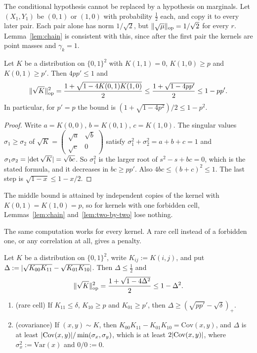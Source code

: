 The conditional hypothesis cannot be replaced by a hypothesis on marginals. Let $(X_1,Y_1)$ be $(0,1)$ or $(1,0)$ with probability $\frac12$ each, and copy it to every later pair. Each pair alone has norm $1/\sqrt2$, but $\lVert \sqrt\mu\rVert_{\mathrm{op}}=1/\sqrt2$ for every $r$. Lemma~\ref{lem:chain} is consistent with this, since after the first pair the kernels are point masses and $\gamma_k=1$.

\begin{lemma}\label{lem:two-by-two}
Let $K$ be a distribution on $\{0,1\}^2$ with $K(1,1)=0$, $K(1,0)\ge p$ and $K(0,1)\ge p'$. Then $4pp'\le1$ and
\[
  \lVert \sqrt K\rVert_{\mathrm{op}}^2=\frac{1+\sqrt{1-4K(0,1)K(1,0)}}2\le\frac{1+\sqrt{1-4pp'}}2\le1-pp' .
\]
In particular, for $p'=p$ the bound is $(1+\sqrt{1-4p^2})/2\le1-p^2$.
\end{lemma}

\begin{proof}
Write $a=K(0,0)$, $b=K(0,1)$, $c=K(1,0)$. The singular values $\sigma_1\ge\sigma_2$ of $\sqrt K=\left(\begin{smallmatrix}\sqrt a&\sqrt b\\ \sqrt c&0\end{smallmatrix}\right)$ satisfy $\sigma_1^2+\sigma_2^2=a+b+c=1$ and $\sigma_1\sigma_2=\lvert \det\sqrt K\rvert=\sqrt{bc}$. So $\sigma_1^2$ is the larger root of $s^2-s+bc=0$, which is the stated formula, and it decreases in $bc\ge pp'$. Also $4bc\le(b+c)^2\le1$. The last step is $\sqrt{1-x}\le1-x/2$.
\end{proof}

The middle bound is attained by independent copies of the kernel with $K(0,1)=K(1,0)=p$, so for kernels with one forbidden cell, Lemmas~\ref{lem:chain} and~\ref{lem:two-by-two} lose nothing.

The same computation works for every kernel. A rare cell instead of a forbidden one, or any correlation at all, gives a penalty.

\begin{lemma}\label{lem:two-by-two-general}
Let $K$ be a distribution on $\{0,1\}^2$, write $K_{ij}:=K(i,j)$, and put $\Delta:=\lvert \sqrt{K_{00}K_{11}}-\sqrt{K_{01}K_{10}}\rvert$. Then $\Delta\le\frac12$ and
\[
  \lVert \sqrt K\rVert_{\mathrm{op}}^2=\frac{1+\sqrt{1-4\Delta^2}}2\le1-\Delta^2 .
\]
\begin{enumerate}[label=(\alph*)]
\item\label{tbt:rare} (rare cell) If $K_{11}\le\delta$, $K_{10}\ge p$ and $K_{01}\ge p'$, then $\Delta\ge(\sqrt{pp'}-\sqrt\delta)_+$.
\item\label{tbt:cov} (covariance) If $(x,y)\sim K$, then $K_{00}K_{11}-K_{01}K_{10}=\mathrm{Cov}(x,y)$, and $\Delta$ is at least $\lvert \mathrm{Cov}(x,y)\rvert/\min(\sigma_x,\sigma_y)$, which is at least $2\lvert \mathrm{Cov}(x,y)\rvert$, where $\sigma_x^2:=\mathrm{Var}(x)$ and $0/0:=0$.
\end{enumerate}
\end{lemma}

